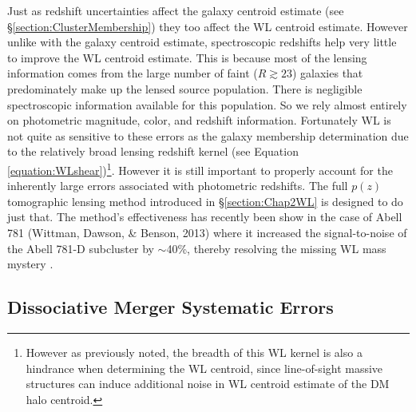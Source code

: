 Just as redshift uncertainties affect the galaxy centroid estimate (see \S\ref{section:ClusterMembership}) they too affect the WL centroid estimate.
However unlike with the galaxy centroid estimate, spectroscopic redshifts help very little to improve the WL centroid estimate.
This is because most of the lensing information comes from the large number of faint ($R\gtrsim23$) galaxies that predominately make up the lensed source population.
There is negligible spectroscopic information available for this population. 
So we rely almost entirely on photometric magnitude, color, and redshift information.
Fortunately WL is not quite as sensitive to these errors as the galaxy membership determination due to the relatively broad lensing redshift kernel (see Equation \ref{equation:WLshear})\footnote{However as previously noted, the breadth of this WL kernel is also a hindrance when determining the WL centroid, since line-of-sight massive structures can induce additional noise in WL centroid estimate of the DM halo centroid.}.
However it is still important to properly account for the inherently large errors associated with photometric redshifts.
The full $p(z)$ tomographic lensing method introduced in \S\ref{section:Chap2WL} is designed to do just that.
The method's effectiveness has recently been show in the case of Abell 781 (Wittman, Dawson, \& Benson, 2013) where it increased the signal-to-noise of the Abell 781-D subcluster by $\sim$40\%, thereby resolving the missing WL mass mystery \citep{Cook:2012ka}.


\subsection{Dissociative Merger Systematic Errors}\label{section:MergerSysError}

